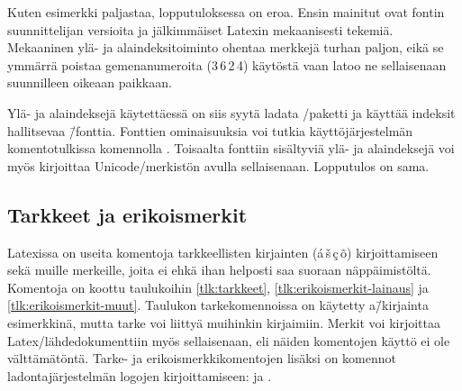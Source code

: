 Kuten esimerkki paljastaa, lopputuloksessa on eroa. Ensin mainitut ovat
fontin suunnittelijan versioita ja jälkimmäiset Latexin mekaanisesti
tekemiä. Mekaaninen ylä- ja ala\-in\-dek\-si\-toi\-min\-to ohentaa
merkkejä turhan paljon, eikä se ymmärrä poistaa gemenanumeroita
(3\,6\,2\,4) käytöstä vaan latoo ne sellaisenaan suunnilleen oikeaan
paikkaan.

Ylä- ja alaindeksejä käytettäessä on siis syytä ladata
\-/paketti ja käyttää indeksit hallitsevaa
 \=/fonttia. Fonttien ominaisuuksia voi tutkia
käyttöjärjestelmän komentotulkissa komennolla .
Toisaalta fonttiin sisältyviä ylä- ja alaindeksejä voi myös kirjoittaa
Unicode\-/merkistön avulla sellaisenaan. Lopputulos on sama.

\subsection{Tarkkeet ja erikoismerkit}
\label{luku:tarkkeet}

Latexissa on useita komentoja tarkkeellisten kirjainten
(\'a\,\v{s}\,\c{c}\,\~o) kirjoittamiseen sekä muille merkeille, joita ei
ehkä ihan helposti saa suoraan näppäimistöltä. Komentoja on koottu
taulukoihin \ref{tlk:tarkkeet}, \ref{tlk:erikoismerkit-lainaus} ja
\ref{tlk:erikoismerkit-muut}. Taulukon tarkekomennoissa on käytetty
a\=/kirjainta esimerkkinä, mutta tarke voi liittyä muihinkin kirjaimiin.
\marginaali{\TeX \\ \LaTeX} Merkit voi kirjoittaa
Latex\-/lähdedokumenttiin myös sellaisenaan, eli näiden komentojen
käyttö ei ole välttämätöntä. Tarke- ja erikoismerkkikomentojen lisäksi
on komennot ladontajärjestelmän logojen kirjoittamiseen:  ja .

\providecommand{\rivi}{}
\renewcommand{\rivi}[3]{{\erikoisfontti #2} & \koodi{\keno #1} & #3 \\}

